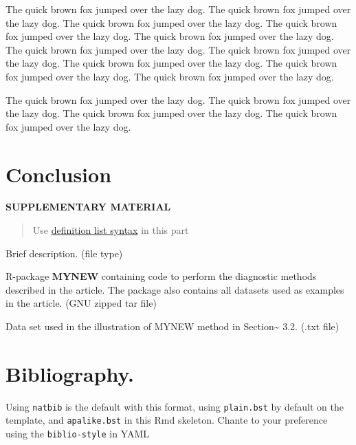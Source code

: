 \documentclass[12pt]{article}
\providecommand{\tightlist}{%
  \setlength{\itemsep}{0pt}\setlength{\parskip}{0pt}}
\begin{document}
The quick brown fox jumped over the lazy dog. The quick brown fox jumped
over the lazy dog. The quick brown fox jumped over the lazy dog. The
quick brown fox jumped over the lazy dog. The quick brown fox jumped
over the lazy dog. The quick brown fox jumped over the lazy dog. The
quick brown fox jumped over the lazy dog. The quick brown fox jumped
over the lazy dog. The quick brown fox jumped over the lazy dog. The
quick brown fox jumped over the lazy dog.

The quick brown fox jumped over the lazy dog. The quick brown fox jumped
over the lazy dog. The quick brown fox jumped over the lazy dog. The
quick brown fox jumped over the lazy dog.

\hypertarget{conc}{%
\section{Conclusion}\label{conc}}

\bigskip

\begin{center}
\textbf{SUPPLEMENTARY MATERIAL}

\end{center}

\begin{quote}
Use \href{https://pandoc.org/MANUAL.html\#definition-lists}{definition
list syntax} in this part
\end{quote}

\begin{description}
\tightlist
\item[Title:]
Brief description. (file type)
\item[R-package for MYNEW routine:]
R-package \textbf{MYNEW} containing code to perform the diagnostic
methods described in the article. The package also contains all datasets
used as examples in the article. (GNU zipped tar file)
\item[HIV data set:]
Data set used in the illustration of MYNEW method in
Section\textasciitilde{} 3.2. (.txt file)
\end{description}

\hypertarget{bibliography.}{%
\section{Bibliography.}\label{bibliography.}}

Using \texttt{natbib} is the default with this format, using
\texttt{plain.bst} by default on the template, and \texttt{apalike.bst}
in this Rmd skeleton. Chante to your preference using the
\texttt{biblio-style} in YAML



\end{document}
